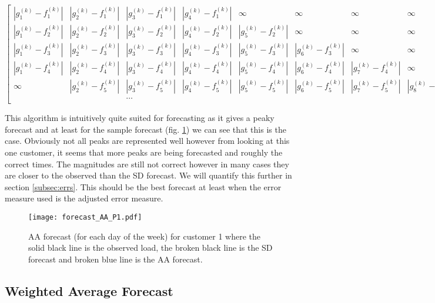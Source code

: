 \centerline{$\begin{bmatrix}
    |g_1^{(k)} - f_1^{(k)}| & |g_2^{(k)} - f_1^{(k)}| & |g_3^{(k)} - f_1^{(k)}| & |g_4^{(k)} -f_1^{(k)}| & \infty  & \infty& \infty & \infty & \dots & \infty \\
    |g_1^{(k)} - f_2^{(k)}| & |g_2^{(k)} - f_2^{(k)}| & |g_3^{(k)} - f_2^{(k)}| &  |g_4^{(k)} - f_2^{(k)}| & |g_5^{(k)} - f_2^{(k)}| & \infty & \infty &\infty & \dots & \infty\\
    |g_1^{(k)} - f_3^{(k)}| & |g_2^{(k)} - f_3^{(k)}| & |g_3^{(k)} - f_3^{(k)}| &  |g_4^{(k)} - f_3^{(k)}|& |g_5^{(k)}- f_3^{(k)}| & |g_6^{(k)}-f_3^{(k)}| & \infty & \infty & \dots  & \infty\\
    |g_1^{(k)}-f_4^{(k)}| & |g_2^{(k)} - f_4^{(k)}| & |g_3^{(k)} - f_4^{(k)}| & |g_4^{(k)} - f_4^{(k)}| &  |g_5^{(k)} - f_4^{(k)}| & |g_6^{(k)}- f_4^{(k)}|& |g_7^{(k)} - f_4^{(k)}| &\infty &\dots & \infty\\
    \infty & |g_2^{(k)} - f_5^{(k)}| & |g_3^{(k)} - f_5^{(k)}| & |g_4^{(k)} - f_5^{(k)}| &  |g_5^{(k)} - f_5^{(k)}|& |g_6^{(k)}- f_5^{(k)}|& |g_7^{(k)} - f_5^{(k)}| &|g_8^{(k)} - f_5^{(k)}| &\dots & \infty\\
     &  & \dots &  & &  & &  & \\
\end{bmatrix}$}

This algorithm is intuitively quite suited for forecasting as it gives a peaky forecast and at least for the sample forecast (fig. \ref{fig:AA_forecast_P1}) we can see that this is the case. Obviously not all peaks are represented well however from looking at this one customer, it seems that more peaks are being forecasted and roughly the correct times. The magnitudes are still not correct however in many cases they are closer to the observed than the SD forecast. We will quantify this further in section \ref{subsec:errs}. This should be the best forecast at least when the error measure used is the adjusted error measure.

\begin{figure}
\centering
\texttt{[image: forecast\_AA\_P1.pdf]}
\caption{AA forecast (for each day of the week) for customer 1 where the solid black line is the observed load, the broken black line is the SD forecast and broken blue line is the AA forecast.}
\label{fig:AA_forecast_P1} 
\end{figure}

\subsection{Weighted Average Forecast}

